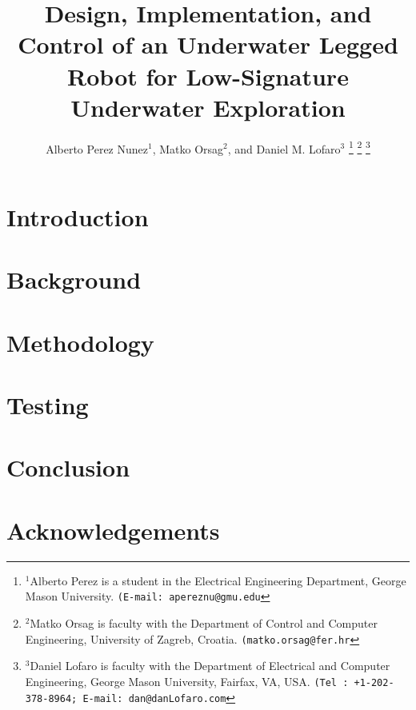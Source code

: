 \documentclass[a4paper, 10pt, conference]{ieeeconf}      %
\title{\LARGE \bf
Design, Implementation, and Control of an Underwater Legged Robot for Low-Signature Underwater Exploration%
}
\author{Alberto Perez Nunez$^{1}$, Matko Orsag$^{2}$, and Daniel M. Lofaro$^{3}$%
\thanks{$^{1}$Alberto Perez is a student in the Electrical Engineering Department, George Mason University.
{\tt\small (E-mail: apereznu@gmu.edu}}%
\thanks{$^{2}$Matko Orsag is faculty with the Department of Control and Computer Engineering, University of Zagreb, Croatia.
	{\tt\small (matko.orsag@fer.hr}}%
\thanks{$^{3}$Daniel Lofaro is faculty with the Department of Electrical and Computer Engineering, George Mason University, Fairfax, VA, USA.
	{\tt\small (Tel : +1-202-378-8964; E-mail: dan@danLofaro.com}}%
}
\begin{document}
\maketitle
\thispagestyle{empty}
\pagestyle{empty}


\begin{abstract}

\end{abstract}


\section{Introduction}



\section{Background}\label{sec:background}


\section{Methodology}


\section{Testing}


%

\section{Conclusion}


\section*{Acknowledgements}





\end{document}
